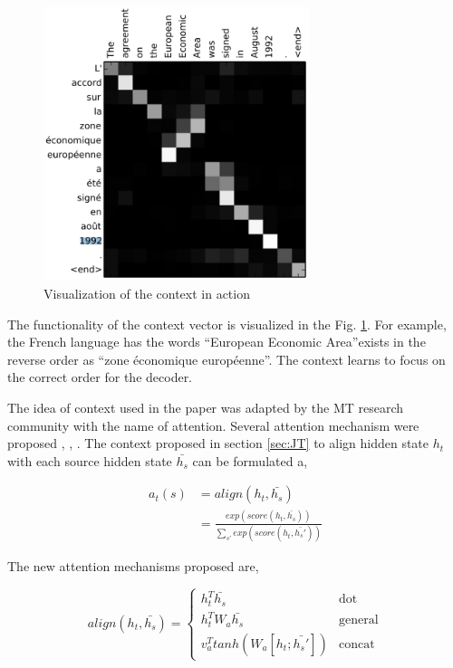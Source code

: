 \documentclass[a4paper]{article}
\begin{document}
\begin{figure}
  \includegraphics[height=8cm]{img/contextres.png}
  \caption{Visualization of the context in action}
  \label{fig:contextvis}
\end{figure}


The  functionality   of  the   context   vector  is  visualized  in   the   Fig.
\ref{fig:contextvis}.   For  example,  the  French  language   has   the   words
\textquotedblleft European Economic Area\textquotedblright exists in the reverse
order as \textquotedblleft zone \'{e}conomique europ\'{e}enne\textquotedblright.
The context learns to focus on the correct order for the decoder.

The idea of  context used in the paper was adapted by the MT  research community
with   the  name  of  attention.  Several  attention  mechanism   were  proposed
\cite{luong2015effective},  \cite{cho2014learning},  \cite{gregor2015draw}.  The
context proposed in section \ref{sec:JT} to  align hidden state  $h_t$ with each
source hidden state $\bar{h_s}$ can be formulated a,


\begin{equation}
  \begin{split}
    a_t(s) & = align(h_t,\bar{h_s}) \\
    & = \frac{exp(score(h_t,\bar{h_s}))}{\sum_{s'} exp(score(h_t,\bar{h_s'}))}
  \end{split}
\end{equation}


The new attention mechanisms proposed are,


\begin{equation*}
  align(h_t,\bar{h_s}) = \begin{cases}
    h_t^T\bar{h_s} & \text{dot} \\
    h_t^TW_a\bar{h_s} & \text{general} \\
    v_a^T tanh (W_a[h_t;\bar{h_s'}]) & \text{concat}
  \end{cases}
\end{equation*}
\end{document}

